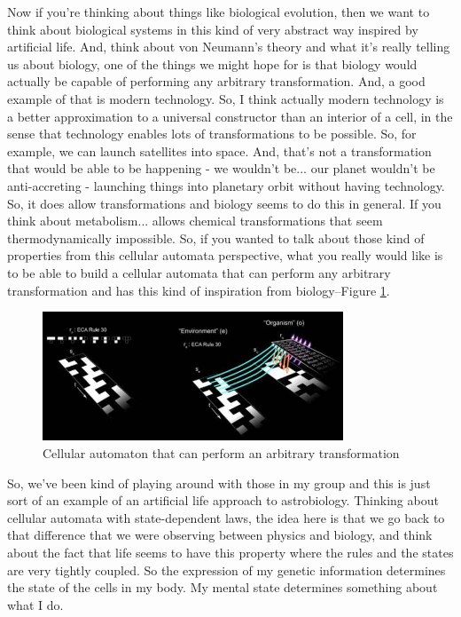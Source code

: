\documentclass[]{article}
\begin{document}
Now if you're thinking about things
like biological evolution,
then we want to think about
biological systems
in this kind of very abstract way
inspired by artificial life.
And, think about von Neumann's theory
and what it's really telling us
about biology,
one of the things we might hope for
is that biology
would actually be capable of
performing any arbitrary transformation.
And, a good example of that
is modern technology.
So, I think actually modern technology
is a better approximation
to a universal constructor
than an interior of a cell,
in the sense that technology enables
lots of transformations to be possible.
So, for example, we can launch
satellites into space.
And, that's not a transformation
that would be able to be happening -
we wouldn't be...
our planet wouldn't be anti-accreting -
launching things into planetary orbit
without having technology.
So, it does allow transformations
and biology seems to do this in general.
If you think about metabolism...
allows chemical transformations
that seem thermodynamically impossible.
So, if you wanted to talk about
those kind of properties
from this cellular automata perspective,
what you really would like
is to be able to build
a cellular automata
that can perform
any arbitrary transformation
and has this kind of inspiration
from biology--Figure \ref{eq:StateDependentLaws}.

\begin{figure}[H]
	\caption[Cellular automaton that can perform an arbitrary transformation]{Cellular automaton that can perform an arbitrary transformation }\label{eq:StateDependentLaws}
	\includegraphics[width=0.8\textwidth]{StateDependentLaws}
\end{figure}
So, we've been kind of playing around with those in my group and this is just sort of an example of an artificial life approach to astrobiology.
Thinking about cellular automata with state-dependent laws, the idea here is that we go back to that difference that we were observing between physics and biology, and think about the fact that life seems to have this property where the rules and the states are very tightly coupled.
So the expression of my genetic information determines the state of the cells in my body.
My mental state determines something about what I do.
\end{document}
